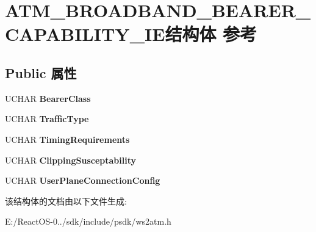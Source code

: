 \hypertarget{struct_a_t_m___b_r_o_a_d_b_a_n_d___b_e_a_r_e_r___c_a_p_a_b_i_l_i_t_y___i_e}{}\section{A\+T\+M\+\_\+\+B\+R\+O\+A\+D\+B\+A\+N\+D\+\_\+\+B\+E\+A\+R\+E\+R\+\_\+\+C\+A\+P\+A\+B\+I\+L\+I\+T\+Y\+\_\+\+I\+E结构体 参考}
\label{struct_a_t_m___b_r_o_a_d_b_a_n_d___b_e_a_r_e_r___c_a_p_a_b_i_l_i_t_y___i_e}
\subsection*{Public 属性}
\begin{DoxyCompactItemize}
\item 
\mbox{\label{struct_a_t_m___b_r_o_a_d_b_a_n_d___b_e_a_r_e_r___c_a_p_a_b_i_l_i_t_y___i_e_a1d6da0471e518ab289aca1434c4b6f5a}} 
U\+C\+H\+AR {\bfseries Bearer\+Class}
\item 
\mbox{\label{struct_a_t_m___b_r_o_a_d_b_a_n_d___b_e_a_r_e_r___c_a_p_a_b_i_l_i_t_y___i_e_af5935ed3394aaa0c517696eede91587f}} 
U\+C\+H\+AR {\bfseries Traffic\+Type}
\item 
\mbox{\label{struct_a_t_m___b_r_o_a_d_b_a_n_d___b_e_a_r_e_r___c_a_p_a_b_i_l_i_t_y___i_e_a4717e2d2ffa51ae7f60160e3ecf4089e}} 
U\+C\+H\+AR {\bfseries Timing\+Requirements}
\item 
\mbox{\label{struct_a_t_m___b_r_o_a_d_b_a_n_d___b_e_a_r_e_r___c_a_p_a_b_i_l_i_t_y___i_e_abad17468dc6d93af0d94caa292190ebf}} 
U\+C\+H\+AR {\bfseries Clipping\+Susceptability}
\item 
\mbox{\label{struct_a_t_m___b_r_o_a_d_b_a_n_d___b_e_a_r_e_r___c_a_p_a_b_i_l_i_t_y___i_e_a98395a1e2f0c35ed2dd2a0e1e5b05fd9}} 
U\+C\+H\+AR {\bfseries User\+Plane\+Connection\+Config}
\end{DoxyCompactItemize}


该结构体的文档由以下文件生成\+:\begin{DoxyCompactItemize}
\item 
E\+:/\+React\+O\+S-\/0../sdk/include/psdk/ws2atm.\+h\end{DoxyCompactItemize}

